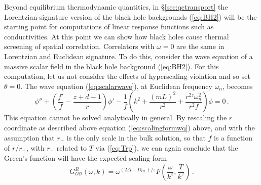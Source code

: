 \documentclass[10pt, oneside]{book}
\def\be{\begin{equation}}
\def\ee{\end{equation}}
\def\ocal{{\mathcal{O}}}
\begin{document}
\begin{doublespace}
Beyond equilibrium thermodynamic quantities, in \S\ref{sec:qctransport} the Lorentzian signature version of the black hole backgrounds (\ref{eq:BH2}) will be the starting point for computations of linear response functions such as conductivities. At this point we can show how black holes cause thermal screening of spatial correlation. Correlators with $\omega = 0$ are the same in Lorentzian and Euclidean signature. To do this, consider the wave equation of a massive scalar field in the black hole background (\ref{eq:BH2}). For this computation, let us not consider the effects of hyperscaling violation and so set $\theta = 0$. The wave equation (\ref{eq:scalarwave}), at Euclidean frequency $\omega_n$, becomes
\be\label{eq:thermalscreening}
\phi'' + \left(\frac{f'}{f} - \frac{z+d-1}{r} \right) \phi' - \frac{1}{f}\left(k^2 + \frac{(mL)^2}{r^2} + \frac{r^{2z} \omega_n^2}{r^2 f}\right)\phi = 0 \,.
\ee
This equation cannot be solved analytically in general. By rescaling the $r$ coordinate as described above equation (\ref{eq:scalingformwq}) above, and with the assumption that $r_+$ is the only scale in the bulk solution, so that $f$ is a function of $r/r_+$, with $r_+$ related to $T$ via (\ref{eq:Trp}), we can again conclude that the Green's function will have the expected scaling form
\be\label{eq:scalingformwqT}
G^R_{\ocal\ocal}(\omega,k) = \omega^{(2 \Delta- D_\text{eff.})/z} F\left(\frac{\omega}{k^z}, \frac{T}{k^z} \right) \,.
\ee


\end{doublespace}
\end{document}
